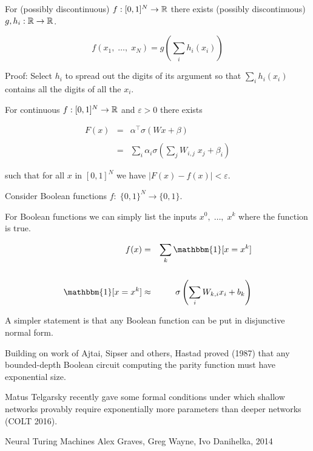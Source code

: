 {For (possibly discontinuous) $f: [0,1]^N \rightarrow \mathbb{R}$ there exists (possibly discontinuous)
$g, h_i: \mathbb{R} \rightarrow \mathbb{R}$.

\vfill
$$f(x_1,\;\ldots,\;x_N) = g\left(\sum_i h_i(x_i)\right)$$

\vfill
Proof: Select $h_i$ to spread out the digits of its argument so that $\sum_i h_i(x_i)$ contains all the digits of all the $x_i$.


For continuous $f: [0,1]^N \rightarrow \mathbb{R}$ and $\varepsilon >0$ there exists

\vfill
\begin{eqnarray*}
  F(x) &= & \alpha^\top \sigma(Wx + \beta) \\
  \\
  & = & \sum_i \alpha_i \sigma\left(\sum_j W_{i,j} \;x_j + \beta_i\right)
\end{eqnarray*}


\vfill
such that for all $x$ in $[0,1]^N$ we have $| F( x ) - f ( x ) | < \varepsilon$.


Consider Boolean functions $f:\;\{0,1\}^N \rightarrow \{0,1\}$.

\vfill
For Boolean functions we can simply list the inputs $x^0,\;\ldots,\;x^k$ where the function is true.

\begin{eqnarray*}
  f(x) & = & \sum_k \mathbbm{1}[x=x^k] \\
  \\
  \mathbbm{1}[x = x^k] & \approx & \sigma\left(\sum_i W_{k,i} x_i + b_k\right)
\end{eqnarray*}

\vfill
A simpler statement is that any Boolean function can be put in disjunctive normal form.


Building on work of Ajtai, Sipser and others, Hastad proved (1987) that any bounded-depth Boolean circuit computing the parity function must have exponential size. 

\vfill
Matus Telgarsky recently gave some formal conditions under which shallow networks provably require exponentially more parameters than deeper networks (COLT 2016).


Neural Turing Machines
Alex Graves, Greg Wayne, Ivo Danihelka, 2014

}
